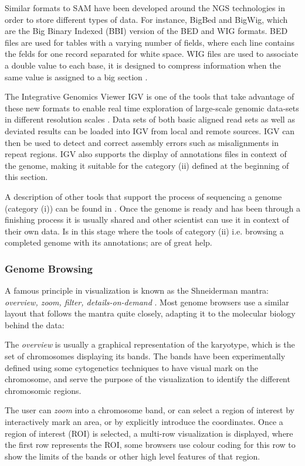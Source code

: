 Similar formats to SAM have been developed around the NGS technologies in order to store different types of data.  For instance, BigBed and BigWig, which  are the Big Binary Indexed (BBI) version of the BED and WIG formats. BED files are used for tables with a varying number of fields, where each line contains the felds for one record separated for white space. WIG files are used to associate a double value to each base, it is designed to compress information when the same value is assigned to a big section \cite{KEN2010}.

The Integrative Genomics Viewer IGV is one of the tools that take advantage of these new formats to enable real time exploration of large-scale genomic data-sets in different resolution scales \cite{ROB2011}. Data sets of both basic aligned read sets as well as deviated results can be loaded into IGV from local and remote sources. IGV can then be used to detect and correct assembly errors such as misalignments in repeat regions. IGV also supports the display of annotations files in context of the genome, making it suitable for the category (ii) defined at the beginning of this section.

A description of other tools that support the process of sequencing a genome (category (i)) can be found in \cite{NIE2010}. Once the genome is ready and has been through a finishing process it is usually shared and other scientist can use it in context of their own data. Is in this stage where the tools of category (ii) i.e. browsing a completed genome with its annotations; are of great help.

\subsubsection{Genome Browsing}
A famous principle in visualization is known as the Shneiderman mantra: \emph{overview, zoom, filter, details-on-demand} \cite{SHN1996}. Most genome browsers use a similar layout that follows the mantra quite closely, adapting it to the molecular biology behind the data:

The \emph{overview} is usually a graphical representation of the karyotype, which is the set of chromosomes displaying its bands. The bands have been experimentally defined using some cytogenetics techniques to have visual mark on the chromosome, and serve the purpose of the visualization to identify the different chromosomic regions.

The user can \emph{zoom} into a chromosome band, or can select a region of interest by interactively mark an area, or by explicitly introduce the coordinates. Once a region of interest (ROI) is selected, a multi-row visualization is displayed, where the first row represents the ROI, some browsers use colour coding for this row to show the limits of the bands or other high level features of that region.

